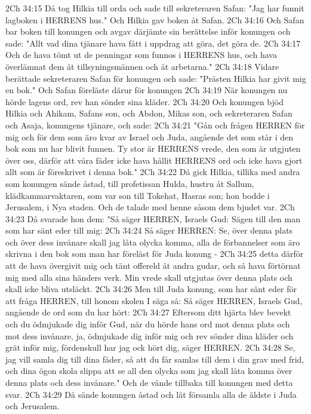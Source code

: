 2Ch 34:15  Då tog Hilkia till orda och sade till sekreteraren Safan: "Jag har funnit lagboken i HERRENS hus." Och Hilkia gav boken åt Safan.
2Ch 34:16  Och Safan bar boken till konungen och avgav därjämte sin berättelse inför konungen och sade: "Allt vad dina tjänare hava fått i uppdrag att göra, det göra de.
2Ch 34:17  Och de hava tömt ut de penningar som funnos i HERRENS hus, och hava överlämnat dem åt tillsyningsmännen och åt arbetarna."
2Ch 34:18  Vidare berättade sekreteraren Safan för konungen och sade: "Prästen Hilkia har givit mig en bok." Och Safan föreläste därur för konungen
2Ch 34:19  När konungen nu hörde lagens ord, rev han sönder sina kläder.
2Ch 34:20  Och konungen bjöd Hilkia och Ahikam, Safans son, och Abdon, Mikas son, och sekreteraren Safan och Asaja, konungens tjänare, och sade:
2Ch 34:21  "Gån och frågen HERREN för mig och för dem som äro kvar av Israel och Juda, angående det som står i den bok som nu har blivit funnen. Ty stor är HERRENS vrede, den som är utgjuten över oss, därför att våra fäder icke hava hållit HERRENS ord och icke hava gjort allt som är föreskrivet i denna bok."
2Ch 34:22  Då gick Hilkia, tillika med andra som konungen sände åstad, till profetissan Hulda, hustru åt Sallum, klädkammarvaktaren, som var son till Tokehat, Hasras son; hon bodde i Jerusalem, i Nya staden. Och de talade med henne såsom dem bjudet var.
2Ch 34:23  Då svarade hon dem: "Så säger HERREN, Israels Gud: Sägen till den man som har sänt eder till mig:
2Ch 34:24  Så säger HERREN: Se, över denna plats och över dess invånare skall jag låta olycka komma, alla de förbannelser som äro skrivna i den bok som man har föreläst för Juda konung -
2Ch 34:25  detta därför att de hava övergivit mig och tänt offereld åt andra gudar, och så hava förtörnat mig med alla sina händers verk. Min vrede skall utgjutas över denna plats och skall icke bliva utsläckt.
2Ch 34:26  Men till Juda konung, som har sänt eder för att fråga HERREN, till honom skolen I säga så: Så säger HERREN, Israels Gud, angående de ord som du har hört:
2Ch 34:27  Eftersom ditt hjärta blev bevekt och du ödmjukade dig inför Gud, när du hörde hans ord mot denna plats och mot dess invånare, ja, ödmjukade dig inför mig och rev sönder dina kläder och grät inför mig, fördenskull har jag ock hört dig, säger HERREN.
2Ch 34:28  Se, jag vill samla dig till dina fäder, så att du får samlas till dem i din grav med frid, och dina ögon skola slippa att se all den olycka som jag skall låta komma över denna plats och dess invånare." Och de vände tillbaka till konungen med detta svar.
2Ch 34:29  Då sände konungen åstad och lät församla alla de äldste i Juda och Jerusalem.
